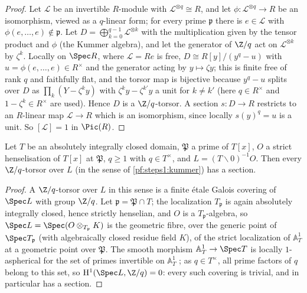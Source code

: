 \begin{proof}
Let $\mathcal L$ be an invertible $R$-module with $\mathcal L^{\otimes q}\cong R$, and let $\phi\colon\mathcal
L^{\otimes q}\to R$ be an isomorphism, viewed as a $q$-linear form; for every prime $\mathfrak p$ there is
$e\in\mathcal L$ with $\phi(e,\dots,e)\notin\mathfrak p$. Let $D=\bigoplus_{k=0}^{q-1}\mathcal L^{\otimes k}$ with the
multiplication given by the tensor product and $\phi$ (the Kummer algebra), and let the generator of $\Z/q$ act on
$\mathcal L^{\otimes k}$ by $\zeta^k$. Locally on $\Spec R$, where $\mathcal L=Re$ is free, $D\cong R[y]/(y^q-u)$ with
$u=\phi(e,\dots,e)\in R^\times$ and the generator acting by $y\mapsto\zeta y$; this is finite free of rank $q$ and
faithfully flat, and the torsor map is bijective because $y^q-u$ splits over $D$ as $\prod_k(Y-\zeta^ky)$ with
$\zeta^ky-\zeta^{k'}y$ a unit for $k\ne k'$ (here $q\in R^\times$ and $1-\zeta^k\in R^\times$ are used). Hence $D$ is a
$\Z/q$-torsor. A section $s\colon D\to R$ restricts to an $R$-linear map $\mathcal L\to R$ which is an isomorphism,
since locally $s(y)^q=u$ is a unit. So $[\mathcal L]=1$ in $\Pic(R)$.
\end{proof}

\begin{lemma}\label{pf:steps1:torsor}
Let $T$ be an absolutely integrally closed domain, $\mathfrak P$ a prime of $T[x]$, $O$ a strict henselisation of
$T[x]$ at $\mathfrak P$, $q\ge1$ with $q\in T^\times$, and $L=(T\smallsetminus0)^{-1}O$. Then every $\Z/q$-torsor over
$L$ (in the sense of \cref{pf:steps1:kummer}) has a section.
\end{lemma}

\begin{proof}
A $\Z/q$-torsor over $L$ in this sense is a finite \'etale Galois covering of $\Spec L$ with group $\Z/q$. Let
$\mathfrak p=\mathfrak P\cap T$; the localization $T_{\mathfrak p}$ is again absolutely integrally closed, hence
strictly henselian, and $O$ is a $T_{\mathfrak p}$-algebra, so $\Spec L=\Spec(O\otimes_{T_{\mathfrak p}}K)$ is the
geometric fibre, over the generic point of $\Spec T_{\mathfrak p}$ (with algebraically closed residue field $K$), of
the strict localization of $\mathbb A^1_T$ at a geometric point over $\mathfrak P$. The smooth morphism
$\mathbb A^1_T\to\Spec T$ is locally $1$-aspherical for the set of primes invertible on $\mathbb A^1_T$
\cite[Exp.~XV, Th.~2.1]{ArtinGrothendieckVerdier1972}; as $q\in T^\times$, all prime factors of $q$ belong to this set,
so $\stepsIH^1(\Spec L,\Z/q)=0$: every such covering is trivial, and in particular has a section.
\end{proof}

